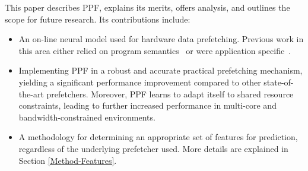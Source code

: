 
\vspace{1ex}This paper describes PPF, explains its merits, offers analysis, and
outlines the scope for future research. Its contributions include:

\begin{itemize}

\item An on-line neural model used for hardware data
  prefetching.  Previous work in this area either relied on program
  semantics~\cite{Semantics} or were application specific~\cite{Datacenter}.

\item Implementing PPF in a robust and accurate
  practical prefetching mechanism, yielding a significant performance
  improvement compared to other state-of-the-art prefetchers.
  Moreover, PPF learns to adapt itself to shared resource
  constraints, leading to further increased performance in multi-core and
  bandwidth-constrained environments.

\item A methodology for determining an appropriate set of 
  features for prediction, regardless of the underlying prefetcher used.
  More details are explained in Section \ref{Method-Features}.

\end{itemize}

